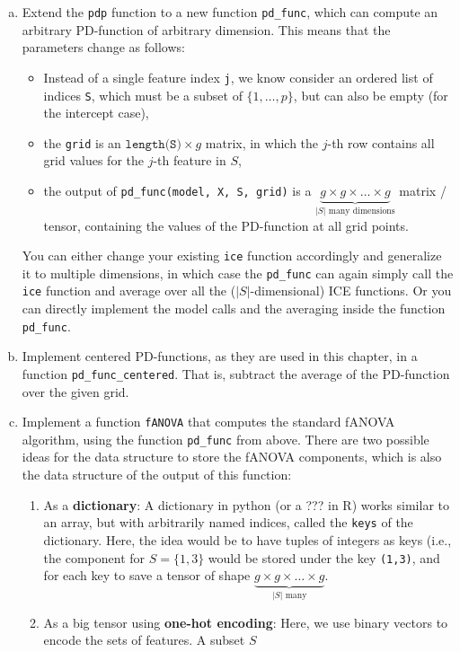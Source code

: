 {\begin{enumerate}[a)]
        \item
        Extend the \texttt{pdp} function to a new function \texttt{pd\_func}, which can compute an arbitrary PD-function of arbitrary dimension.
        This means that the parameters change as follows:
        \begin{itemize}
            \item Instead of a single feature index \texttt{j}, we know consider an ordered list of indices \texttt{S}, which must be a subset of $\{1, \dots, p\}$, but can also be empty (for the intercept case),
            \item the \texttt{grid} is an $\texttt{length(S)} \times g$ matrix, in which the $j$-th row contains all grid values for the $j$-th feature in $S$,
            \item the output of \texttt{pd\_func(model, X, S, grid)} is a $\underbrace{g \times g \times \dots \times g}_{|S| \text{ many dimensions}}$ matrix / tensor, containing the values of the PD-function at all grid points.
        \end{itemize}
        You can either change your existing \texttt{ice} function accordingly and generalize it to multiple dimensions, in which case the \texttt{pd\_func} can again simply call the \texttt{ice} function and average over all the ($|S|$-dimensional) ICE functions.
        Or you can directly implement the model calls and the averaging inside the function \texttt{pd\_func}.

        \item 
        Implement centered PD-functions, as they are used in this chapter, in a function \texttt{pd\_func\_centered}.
        That is, subtract the average of the PD-function over the given grid.

        \item
        Implement a function \texttt{fANOVA} that computes the standard fANOVA algorithm, using the function \texttt{pd\_func} from above.
        There are two possible ideas for the data structure to store the fANOVA components, which is also the data structure of the output of this function:
        \begin{enumerate}
            \item As a \textbf{dictionary}:
            A dictionary in python (or a ??? in R) works similar to an array, but with arbitrarily named indices, called the \texttt{keys} of the dictionary.
            Here, the idea would be to have tuples of integers as keys (i.e., the component for $S = \{1,3\}$ would be stored under the key \texttt{(1,3)}, and for each key to save a tensor of shape $\underbrace{g \times g \times \dots \times g}_{|S| \text{ many}}$.
            \item As a big tensor using \textbf{one-hot encoding}:
            Here, we use binary vectors to encode the sets of features.
            A subset $S$
        \end{enumerate}


\end{enumerate}}
